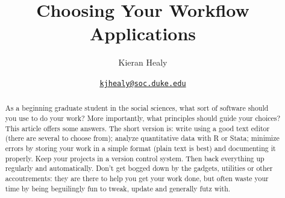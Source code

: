 \documentclass[11pt,article,oneside]{memoir}
\begin{document}
\pagestyle{kjh}

\setsansfont[Mapping=tex-text]{Myriad Pro} 
\setmonofont[Mapping=tex-text,Scale=0.9]{Inconsolata} 

\title{\bigskip Choosing Your Workflow Applications}

\author{Kieran Healy}
\date{{\scriptsize{\texttt{\href{mailto:kjhealy@soc.duke.edu}{kjhealy@soc.duke.edu}}}}} 


\maketitle

%  


\thispagestyle{kjhgit}
 
\begin{abstract}
\noindent As a beginning graduate student in the social sciences, what sort of software should you use to do your work? More importantly, what principles should guide your choices? This article offers some answers. The short version is: write using a good text editor (there are several to choose from); analyze quantitative data with R or Stata; minimize errors by storing your work in a simple format (plain text is best) and documenting it properly. Keep your projects in a version control system. Then back everything up regularly and automatically. Don't get bogged down by the gadgets, utilities or other accoutrements: they are there to help you get your work done, but often  waste your time by being beguilingly fun to tweak, update and generally futz with.  
\end{abstract}
\end{document}
